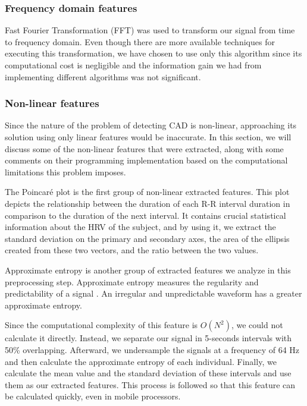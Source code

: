 \subsubsection{Frequency domain features}
\label{sssec:frequency_domain_features}

Fast Fourier Transformation (FFT) was used to transform our signal from time to frequency domain. Even though there are more available techniques for executing this transformation, we have chosen to use only this algorithm since its computational cost is negligible and the information gain we had from implementing different algorithms was not significant.

\subsubsection{Non-linear features}
\label{sssec:non-linear_features}

Since the nature of the problem of detecting CAD is non-linear, approaching its solution using only linear features would be inaccurate. In this section, we will discuss some of the non-linear features that were extracted, along with some comments on their programming implementation based on the computational limitations this problem imposes.

The Poincaré plot \cite{poincare} is the first group of non-linear extracted features. This plot depicts the relationship between the duration of each R-R interval duration in comparison to the duration of the next interval. It contains crucial statistical information about the HRV of the subject, and by using it, we extract the standard deviation on the primary and secondary axes, the area of the ellipsis created from these two vectors, and the ratio between the two values.

Approximate entropy is another group of extracted features we analyze in this preprocessing step. Approximate entropy measures the regularity and predictability of a signal \cite{appEn_article}. An irregular and unpredictable waveform has a greater approximate entropy. 

Since the computational complexity of this feature is $O(N^2)$, we could not calculate it directly. Instead, we separate our signal in 5-seconds intervals with 50\% overlapping. Afterward, we undersample the signals at a frequency of 64 Hz and then calculate the approximate entropy of each individual. Finally, we calculate the mean value and the standard deviation of these intervals and use them as our extracted features. This process is followed so that this feature can be calculated quickly, even in mobile processors.

